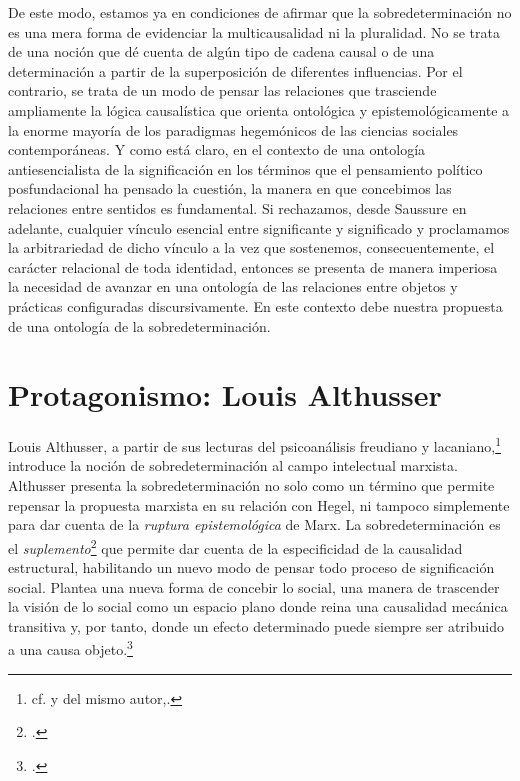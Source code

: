 De este modo, estamos ya en condiciones de afirmar que la sobredeterminación no es una mera forma de evidenciar la multicausalidad ni la pluralidad. No se trata de una noción que dé cuenta de algún tipo de cadena causal o de una determinación a partir de la superposición de diferentes influencias. Por el contrario, se trata de un modo de pensar las relaciones que trasciende ampliamente la lógica causalística que orienta ontológica y epistemológicamente a la enorme mayoría de los paradigmas hegemónicos de las ciencias sociales contemporáneas. Y como está claro, en el contexto de una ontología antiesencialista de la significación en los términos que el pensamiento político posfundacional ha pensado la cuestión, la manera en que concebimos las relaciones entre sentidos es fundamental. Si rechazamos, desde Saussure en adelante, cualquier vínculo esencial entre significante y significado y proclamamos la arbitrariedad de dicho vínculo a la vez que sostenemos, consecuentemente, el carácter relacional de toda identidad, entonces se presenta de manera imperiosa la necesidad de avanzar en una ontología de las relaciones entre objetos y prácticas configuradas discursivamente. En este contexto debe nuestra propuesta de una ontología de la sobredeterminación.


\section{Protagonismo: Louis Althusser}

Louis Althusser, a partir de sus lecturas del psicoanálisis freudiano y lacaniano,\footnote{cf. \cite[][171 nota 46]{@7051-ALTHUSSER1965} y del mismo autor,\cite[][17-48]{@7033-ALTHUSSER1993}.} introduce la noción de sobredeterminación al campo intelectual marxista. Althusser presenta la sobredeterminación no solo como un término que permite repensar la propuesta marxista en su relación con Hegel, ni tampoco simplemente para dar cuenta de la \emph{ruptura epistemológica} de Marx. La sobredeterminación es el \emph{suplemento}\footcite[][]{@7034-DAIN2011}
que permite dar cuenta de la especificidad de la causalidad estructural, habilitando un nuevo modo de pensar todo proceso de significación social. Plantea una nueva forma de concebir lo social, una manera de trascender la visión de lo social como un espacio plano donde reina una causalidad mecánica transitiva y, por tanto, donde un efecto determinado puede siempre ser atribuido a una causa objeto.\footcite[][197]{@7051-ALTHUSSER1965}

